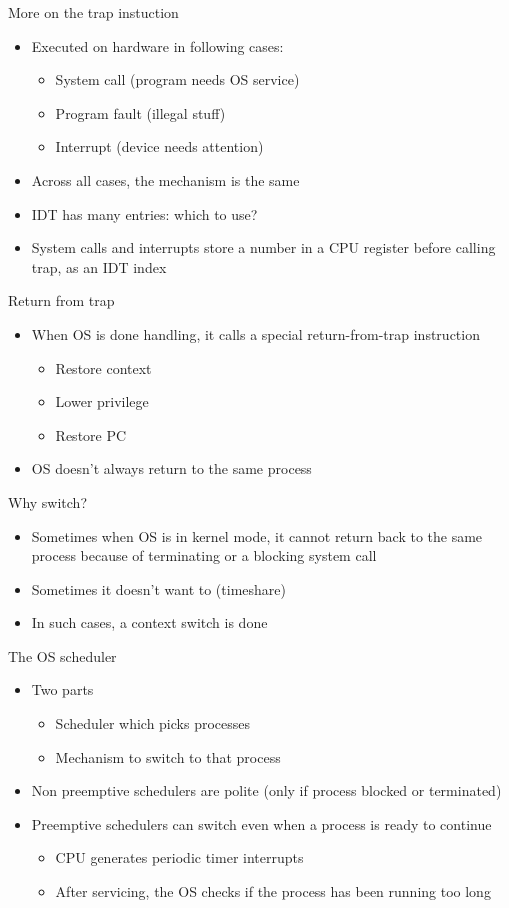 \documentclass[12pt]{article}
\begin{document}
More on the trap instuction
\begin{itemize}
    \item Executed on hardware in following cases:
    \begin{itemize}
        \item System call (program needs OS service)
        \item Program fault (illegal stuff)
        \item Interrupt (device needs attention)
    \end{itemize}
    \item Across all cases, the mechanism is the same
    \item IDT has many entries: which to use?
    \item System calls and interrupts store a number in a CPU register before calling trap, as an IDT index
\end{itemize}

Return from trap 
\begin{itemize}
    \item When OS is done handling, it calls a special return-from-trap instruction 
    \begin{itemize}
        \item Restore context
        \item Lower privilege
        \item Restore PC
    \end{itemize}
    \item OS doesn't always return to the same process
\end{itemize}

Why switch?
\begin{itemize}
    \item Sometimes when OS is in kernel mode, it cannot return back to the same process because of terminating or a blocking system call
    \item Sometimes it doesn't want to (timeshare)
    \item In such cases, a context switch is done
\end{itemize}

The OS scheduler
\begin{itemize}
    \item Two parts
    \begin{itemize}
        \item Scheduler which picks processes
        \item Mechanism to switch to that process
    \end{itemize}
    \item Non preemptive schedulers are polite (only if process blocked or terminated)
    \item Preemptive schedulers can switch even when a process is ready to continue
    \begin{itemize}
        \item CPU generates periodic timer interrupts
        \item After servicing, the OS checks if the process has been running too long
    \end{itemize}
\end{itemize}
\newpage
\end{document}

